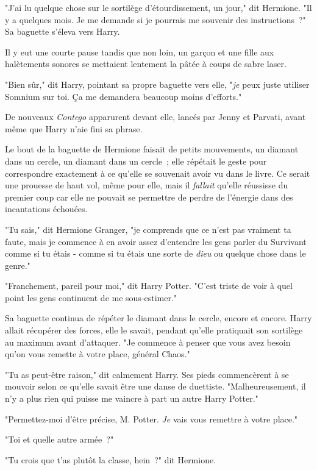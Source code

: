 "J'ai lu quelque chose sur le sortilège d'étourdissement, un jour," dit Hermione. "Il y a quelques mois. Je me demande si je pourrais me souvenir des instructions~?" Sa baguette s'éleva vers Harry.

Il y eut une courte pause tandis que non loin, un garçon et une fille aux halètements sonores se mettaient lentement la pâtée à coups de sabre laser.

"Bien sûr," dit Harry, pointant sa propre baguette vers elle, "\emph{je} peux juste utiliser Somnium sur toi. Ça me demandera beaucoup moins d'efforts."

De nouveaux \emph{Contego} apparurent devant elle, lancés par Jenny et Parvati, avant même que Harry n'aie fini sa phrase.

Le bout de la baguette de Hermione faisait de petits mouvements, un diamant dans un cercle, un diamant dans un cercle~; elle répétait le geste pour correspondre exactement à ce qu'elle se souvenait avoir vu dans le livre. Ce serait une prouesse de haut vol, même pour elle, mais il \emph{fallait} qu'elle réussisse du premier coup car elle ne pouvait se permettre de perdre de l'énergie dans des incantations échouées.

"Tu sais," dit Hermione Granger, "je comprends que ce n'est pas vraiment ta faute, mais je commence à en avoir assez d'entendre les gens parler du Survivant comme si tu étais - comme si tu étais une sorte de \emph{dieu} ou quelque chose dans le genre."

"Franchement, pareil pour moi," dit Harry Potter. "C'est triste de voir à quel point les gens continuent de me sous-estimer."

Sa baguette continua de répéter le diamant dans le cercle, encore et encore. Harry allait récupérer des forces, elle le savait, pendant qu'elle pratiquait son sortilège au maximum avant d'attaquer. "Je commence à penser que vous avez besoin qu'on vous remette à votre place, général Chaos."

"Tu as peut-être raison," dit calmement Harry. Ses pieds commencèrent à se mouvoir selon ce qu'elle savait être une danse de duettiste. "Malheureusement, il n'y a plus rien qui puisse me vaincre à part un autre Harry Potter."

"Permettez-moi d'être précise, M. Potter. \emph{Je} vais vous remettre à votre place."

"Toi et quelle autre armée~?"

"Tu crois que t'as plutôt la classe, hein~?" dit Hermione.

